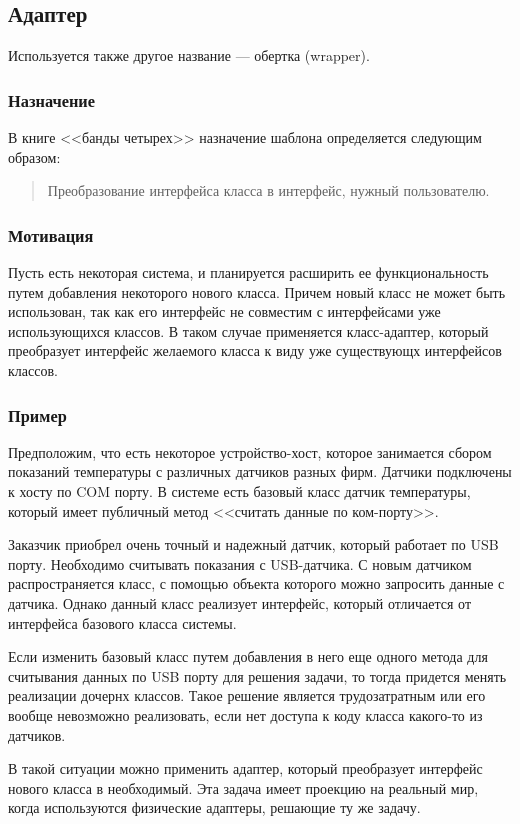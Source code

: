 \documentclass[10pt]{article}
\begin{document}
\subsection{Адаптер}
Используется также другое название --- обертка (wrapper).
\subsubsection{Назначение}
В книге <<банды четырех>> назначение шаблона определяется
следующим образом:
\begin{quote}
Преобразование интерфейса класса в интерфейс, нужный пользователю.
\end{quote}

\subsubsection{Мотивация}
Пусть есть некоторая система, и планируется расширить ее функциональность
путем добавления некоторого нового класса. Причем новый класс не может быть
использован, так как его интерфейс не совместим с интерфейсами уже использующихся классов.
В таком случае применяется класс-адаптер, который преобразует интерфейс желаемого
класса к виду уже существующх интерфейсов классов.

\subsubsection{Пример}
Предположим, что есть некоторое устройство-хост, которое занимается сбором
показаний температуры с различных датчиков разных фирм. Датчики подключены к хосту
по COM порту. В системе есть базовый класс датчик температуры, который имеет публичный метод
<<считать данные по ком-порту>>.

Заказчик приобрел очень точный и надежный датчик, который работает по USB
порту. Необходимо считывать показания с USB-датчика. С новым датчиком распространяется класс,
с помощью объекта которого можно запросить данные с датчика. Однако данный класс
реализует интерфейс, который отличается от интерфейса базового класса системы.

Если изменить базовый класс путем добавления в него еще одного метода для считывания данных
по USB порту для решения задачи, то тогда придется менять реализации дочернх классов.
Такое решение является трудозатратным или его вообще невозможно реализовать,
если нет доступа к коду класса какого-то из датчиков.

В такой ситуации можно применить адаптер, который преобразует интерфейс нового класса в необходимый.
Эта задача имеет проекцию на реальный мир, когда используются физические адаптеры, решающие ту же задачу.
\end{document}
